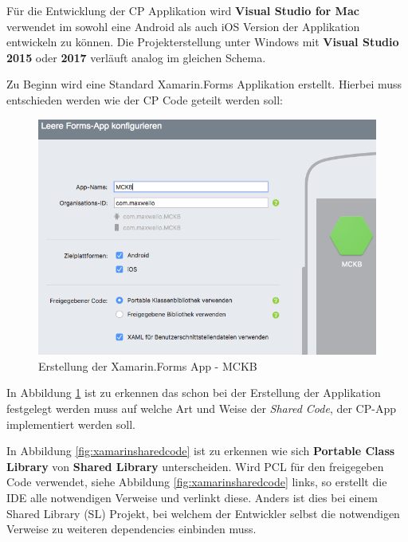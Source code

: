 	Für die Entwicklung der CP Applikation wird \textbf{Visual Studio for Mac} verwendet im sowohl eine Android als auch iOS Version der Applikation entwickeln zu können. Die Projekterstellung unter Windows mit \textbf{Visual Studio 2015} oder \textbf{2017} verläuft analog im gleichen Schema.

	Zu Beginn wird eine Standard Xamarin.Forms Applikation erstellt. Hierbei muss entschieden werden wie der CP Code geteilt werden soll:

	\begin{figure}[h!]
		\centering
		\includegraphics[width=1\textwidth]{images/Project-Setup-one.png}
		\caption{Erstellung der Xamarin.Forms App - MCKB}
		\label{fig:xamarinprojectstart}
	\end{figure}

	In Abbildung \ref{fig:xamarinprojectstart} ist zu erkennen das schon bei der Erstellung der Applikation festgelegt werden muss auf welche Art und Weise der \textit{Shared Code}, der CP-App implementiert werden soll.

	In Abbildung \ref{fig:xamarinsharedcode} ist zu erkennen wie sich \textbf{Portable Class Library} von \textbf{Shared Library} unterscheiden. Wird PCL für den freigegeben Code verwendet, siehe Abbildung \ref{fig:xamarinsharedcode} links, so erstellt die IDE alle notwendigen Verweise und verlinkt diese. Anders ist dies bei einem Shared Library (SL) Projekt, bei welchem der Entwickler selbst die notwendigen Verweise zu weiteren dependencies einbinden muss.

